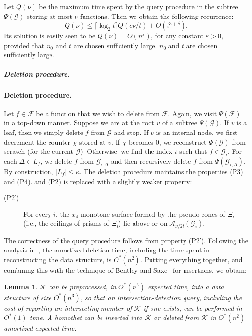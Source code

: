 \documentclass[11pt]{article}
\def\eps{{\varepsilon}}
\def\A{\mathcal{A}}
\def\F{\mathcal{F}}
\def\G{\mathcal{G}}
\def\K{\mathcal{K}}
\def\ceil#1{\lceil #1\rceil}
\newtheorem{lemma}[theorem]{Lemma}
\theoremstyle{definition}
\begin{document}
Let $Q(\nu)$ be the maximum time spent by the query procedure in the subtree $\Psi(\G)$ 
storing at most $\nu$ functions. Then we obtain the following recurrence:
\[ Q(\nu) \le \ceil{\log_2 t} Q(c\nu/t) + O(t^{3+\delta}) .\]
Its solution is easily seen to be $Q(\nu) = O(n^\eps)$, for any constant $\eps>0$, provided that 
\ifsocgproc
$n_0$ and $t$ are chosen sufficiently large.
\else 
	$n_0$ and $t$ are chosen sufficiently large.
  \fi

\ifsocgproc 
\subparagraph*{Deletion procedure.}
\else
\paragraph{Deletion procedure.}
\fi
Let $f\in\F$ be a function that we wish to delete from $\F$.
Again, we visit $\Psi(\F)$ in a top-down manner. Suppose we are at the root $v$ of a subtree $\Psi(\G)$. 
If $v$ is a leaf, then we simply delete $f$ from $\G$ and stop. If $v$ is an internal node, we first 
decrement the counter $\chi$ stored at $v$. If $\chi$ becomes $0$, we reconstruct $\Psi(\G)$ from
scratch (for the current $\G$). Otherwise, we find the index $i$ such that $f\in \G_i$. 
For each $\Delta\in L_f$,  we delete $f$ from $\G_{i,\Delta}$ and then recursively delete 
$f$ from $\Psi(\G_{i,\Delta})$. By construction, $|L_f|\le \kappa$. The deletion procedure 
maintains the properties (P3) and (P4), and (P2) is replaced with a slightly weaker property:

\smallskip
\begin{description}
	\item[(P2')] For every $i$, the $x_4$-monotone surface formed by the pseudo-cones of $\Xi_i$ 
        (i.e., the ceilings of prisms of $\Xi_i$) lie above or on $\A_{\nu/2t} (\G_i)$.
\end{description}

The correctness of the query procedure follows from property (P2'). Following the analysis 
in~\cite{AM95}, the amortized deletion time, including the time spent in reconstructing the data 
structure, is $O^*(n^2)$. 
Putting everything together, and combining this with the technique of Bentley and Saxe~\cite{BS80}
for insertions, we obtain:

\begin{lemma}
	\label{lem:log-qtime}
$\K$ can be preprocessed,
in $O^*(n^3)$ expected time, into a data structure of size $O^*(n^3)$, so that 
an intersection-detection query, including the cost of reporting an intersecting member of $\K$ 
if one exists, can be performed in $O^*(1)$ time. 
A homothet can be inserted into $\K$ or deleted from $\K$ in $O^*(n^2)$ amortized expected time.
\end{lemma}
\end{document}
